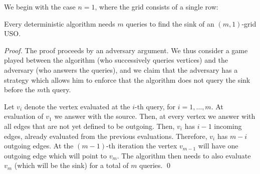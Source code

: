 \documentclass[runningheads,a4paper]{llncs}
\begin{document}
We begin with the case $n=1$, where the grid consists of a single row:

\begin{lemma}\label{lem:kx1}
Every deterministic algorithm needs $m$ queries to find the sink of an $(m,1)$-grid USO.
\end{lemma}
\begin{proof}
    The proof proceeds by an adversary argument.
    We thus consider a game played between the algorithm (who successively
    queries vertices) and the adversary (who answers the queries),
    and we claim that the adversary has a strategy which allows him to enforce
    that the algorithm does not query the sink before the $m$th query.

Let $v_i$ denote the vertex evaluated at the $i$-th query, for $i=1,\ldots, m$. At evaluation of $v_1$ we answer with the source. Then, at every vertex
we answer with all edges that are not yet defined to be outgoing. Then, $v_i$ has $i-1$ incoming edges, already evaluated from the previous evaluations. 
Therefore, $v_i$ has $m-i$ outgoing edges. At the $(m-1)$-th iteration the vertex $v_{m-1}$ will have one outgoing edge which will point to $v_m$.
The algorithm then needs to also evaluate $v_m$ (which will be the sink) for a total of $m$ queries. \qed 
\end{proof}
\end{document}
